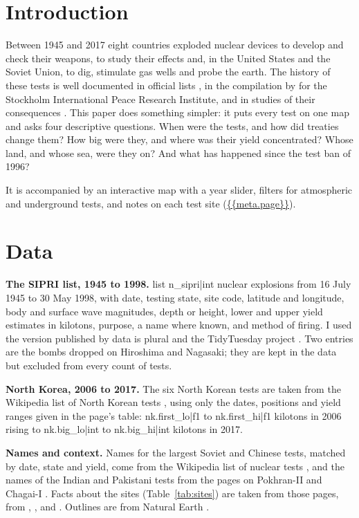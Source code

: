 \documentclass[11pt,a4paper]{article}
\begin{document}
\section{Introduction}
Between 1945 and 2017 eight countries exploded nuclear devices to develop and check their weapons, to study their effects and, in the United States and the Soviet Union, to dig, stimulate gas wells and probe the earth. The history of these tests is well documented in official lists \citep{doe,mikhailov}, in the compilation by \citet{sipri} for the Stockholm International Peace Research Institute, and in studies of their consequences \citep{unscear}. This paper does something simpler: it puts every test on one map and asks four descriptive questions. When were the tests, and how did treaties change them? How big were they, and where was their yield concentrated? Whose land, and whose sea, were they on? And what has happened since the test ban of 1996?

It is accompanied by an interactive map with a year slider, filters for atmospheric and underground tests, and notes on each test site (\url{{{meta.page}}}).

\section{Data}
\textbf{The SIPRI list, 1945 to 1998.} \citet{sipri} list {{n_sipri|int}} nuclear explosions from 16 July 1945 to 30 May 1998, with date, testing state, site code, latitude and longitude, body and surface wave magnitudes, depth or height, lower and upper yield estimates in kilotons, purpose, a name where known, and method of firing. I used the version published by data is plural and the TidyTuesday project \citep{tidytuesday}. Two entries are the bombs dropped on Hiroshima and Nagasaki; they are kept in the data but excluded from every count of tests.

\textbf{North Korea, 2006 to 2017.} The six North Korean tests are taken from the Wikipedia list of North Korean tests \citep{wikink}, using only the dates, positions and yield ranges given in the page's table: {{nk.first_lo|f1}} to {{nk.first_hi|f1}} kilotons in 2006 rising to {{nk.big_lo|int}} to {{nk.big_hi|int}} kilotons in 2017.

\textbf{Names and context.} Names for the largest Soviet and Chinese tests, matched by date, state and yield, come from the Wikipedia list of nuclear tests \citep{wikilist}, and the names of the Indian and Pakistani tests from the pages on Pokhran-II and Chagai-I \citep{wikipok,wikichagai}. Facts about the sites (Table~\ref{tab:sites}) are taken from those pages, from \citet{unscear}, \citet{royal}, \citet{khalturin} and \citet{kuletz}. Outlines are from Natural Earth \citep{naturalearth}.
\end{document}
